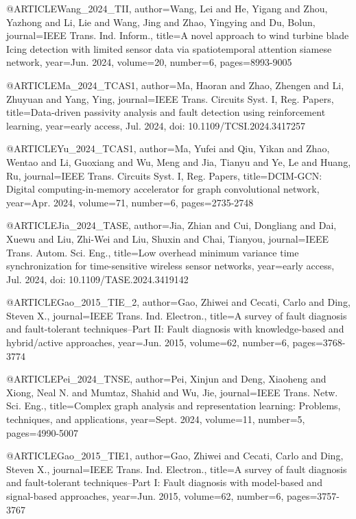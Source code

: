 @ARTICLE{Wang_2024_TII,
  author={Wang, Lei and He, Yigang and Zhou, Yazhong and Li, Lie and Wang, Jing and Zhao, Yingying and Du, Bolun},
  journal={IEEE Trans. Ind. Inform.}, 
  title={A novel approach to wind turbine blade Icing detection with limited sensor data via spatiotemporal attention siamese network}, 
  year={Jun. 2024},
  volume={20},
  number={6},
  pages={8993-9005}}


@ARTICLE{Ma_2024_TCAS1,
  author={Ma, Haoran and Zhao, Zhengen and Li, Zhuyuan and Yang, Ying},
  journal={IEEE Trans. Circuits Syst. I, Reg. Papers}, 
  title={Data-driven passivity analysis and fault detection using reinforcement learning}, 
  year={early access, Jul. 2024, doi: 10.1109/TCSI.2024.3417257}}

@ARTICLE{Yu_2024_TCAS1,
  author={Ma, Yufei and Qiu, Yikan and Zhao, Wentao and Li, Guoxiang and Wu, Meng and Jia, Tianyu and Ye, Le and Huang, Ru},
  journal={IEEE Trans. Circuits Syst. I, Reg. Papers}, 
  title={DCIM-GCN: Digital computing-in-memory accelerator for graph convolutional network}, 
  year={Apr. 2024},
  volume={71},
  number={6},
  pages={2735-2748}}


@ARTICLE{Jia_2024_TASE,
  author={Jia, Zhian and Cui, Dongliang and Dai, Xuewu and Liu, Zhi-Wei and Liu, Shuxin and Chai, Tianyou},
  journal={IEEE Trans. Autom. Sci. Eng.}, 
  title={Low overhead minimum variance time synchronization for time-sensitive wireless sensor networks}, 
  year={early access, Jul. 2024, doi: 10.1109/TASE.2024.3419142}}

@ARTICLE{Gao_2015_TIE_2,
 author={Gao, Zhiwei and Cecati, Carlo and Ding, Steven X.},
  journal={IEEE Trans. Ind. Electron.}, 
  title={A survey of fault diagnosis and fault-tolerant techniques--{P}art {II}: Fault diagnosis with knowledge-based and hybrid/active approaches}, 
  year={Jun. 2015},
  volume={62},
  number={6},
  pages={3768-3774}}


@ARTICLE{Pei_2024_TNSE,
  author={Pei, Xinjun and Deng, Xiaoheng and Xiong, Neal N. and Mumtaz, Shahid and Wu, Jie},
  journal={IEEE Trans. Netw. Sci. Eng.}, 
  title={Complex graph analysis and representation learning: Problems, techniques, and applications}, 
  year={Sept. 2024},
  volume={11},
  number={5},
  pages={4990-5007}}

@ARTICLE{Gao_2015_TIE1,
  author={Gao, Zhiwei and Cecati, Carlo and Ding, Steven X.},
  journal={IEEE Trans. Ind. Electron.}, 
  title={A survey of fault diagnosis and fault-tolerant techniques--{P}art {I}: Fault diagnosis with model-based and signal-based approaches}, 
  year={Jun. 2015},
  volume={62},
  number={6},
  pages={3757-3767}}


